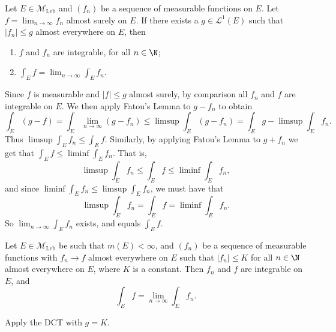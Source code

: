 \documentclass{maths}
\newcommand{\mleb}{\mathcal{M}_{\text{Leb}}}
\begin{document}
\begin{thm}
    Let $E\in\mleb$ and $(f_n)$ be a sequence of measurable functions on $E$.
    Let $f=\lim_{n\to\infty}f_n$ almost surely on $E$.
    If there exists a $g\in \mathcal{L}^1(E)$ such that $|f_n|\leqslant g$ almost everywhere on $E$, then
    \begin{enumerate}
        \item $f$ and $f_n$ are integrable, for all $n\in\N$;
        \item $\int_E f = \lim_{n\to\infty}\int_E f_n$.
    \end{enumerate}
\end{thm}

\begin{prf}
    Since $f$ is measurable and $|f|\leqslant g$ almost surely, by comparison all $f_n$ and $f$ are integrable on $E$.
    We then apply Fatou's Lemma to $g-f_n$ to obtain
    \[
        \int_E (g-f) =
        \int_E \lim_{n\to\infty} (g-f_n) \leqslant
        \limsup \int_E (g-f_n) =
        \int_E g - \limsup \int_E f_n.
    \]
    Thus $\limsup\int_E f_n\leqslant \int_E f$.
    Similarly, by applying Fatou's Lemma to $g+f_n$ we get that $\int_E f\leqslant\liminf\int_E f_n$.
    That is,
    \[
        \limsup\int_E f_n \leqslant
        \int_E f \leqslant
        \liminf\int_E f_n,
    \]
    and since $\liminf\int_E f_n\leqslant\limsup\int_E f_n$, we must have that
    \[
        \limsup\int_E f_n =
        \int_E f =
        \liminf\int_E f_n.
    \]
    So $\lim_{n\to\infty}\int_E f_n$ exists, and equals $\int_E f$.
\end{prf}

\begin{cor}
    Let $E\in\mleb$ be such that $m(E)<\infty$, and $(f_n)$ be a sequence of measurable functions with $f_n\to f$ almost everywhere on $E$ such that $|f_n|\leqslant K$ for all $n\in\N$ almost everywhere on $E$, where $K$ is a constant.
    Then $f_n$ and $f$ are integrable on $E$, and
    \[
        \int_E f =
        \lim_{n\to\infty} \int_E f_n.
    \]
\end{cor}

\begin{prf}
    Apply the DCT with $g=K$.
\end{prf}
\end{document}
